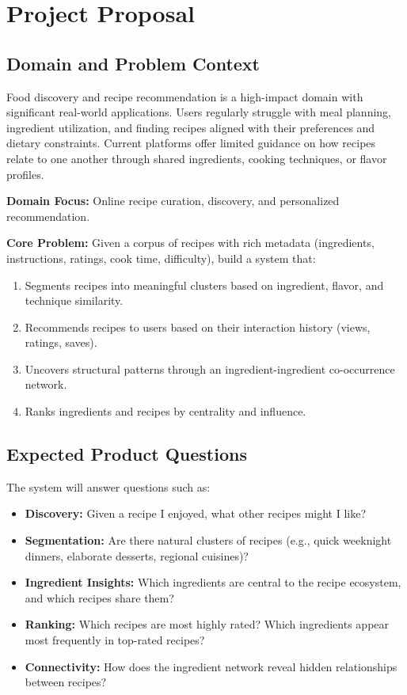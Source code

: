 \documentclass[11pt,a4paper]{article}
\begin{document}
\section{Project Proposal}

\subsection{Domain and Problem Context}

Food discovery and recipe recommendation is a high-impact domain with significant real-world applications. Users regularly struggle with meal planning, ingredient utilization, and finding recipes aligned with their preferences and dietary constraints. Current platforms offer limited guidance on how recipes relate to one another through shared ingredients, cooking techniques, or flavor profiles.

\textbf{Domain Focus:} Online recipe curation, discovery, and personalized recommendation.

\textbf{Core Problem:} Given a corpus of recipes with rich metadata (ingredients, instructions, ratings, cook time, difficulty), build a system that:
\begin{enumerate}
    \item Segments recipes into meaningful clusters based on ingredient, flavor, and technique similarity.
    \item Recommends recipes to users based on their interaction history (views, ratings, saves).
    \item Uncovers structural patterns through an ingredient-ingredient co-occurrence network.
    \item Ranks ingredients and recipes by centrality and influence.
\end{enumerate}

\subsection{Expected Product Questions}

The system will answer questions such as:

\begin{itemize}
    \item \textbf{Discovery:} Given a recipe I enjoyed, what other recipes might I like?
    \item \textbf{Segmentation:} Are there natural clusters of recipes (e.g., quick weeknight dinners, elaborate desserts, regional cuisines)?
    \item \textbf{Ingredient Insights:} Which ingredients are central to the recipe ecosystem, and which recipes share them?
    \item \textbf{Ranking:} Which recipes are most highly rated? Which ingredients appear most frequently in top-rated recipes?
    \item \textbf{Connectivity:} How does the ingredient network reveal hidden relationships between recipes?
\end{itemize}
\end{document}
